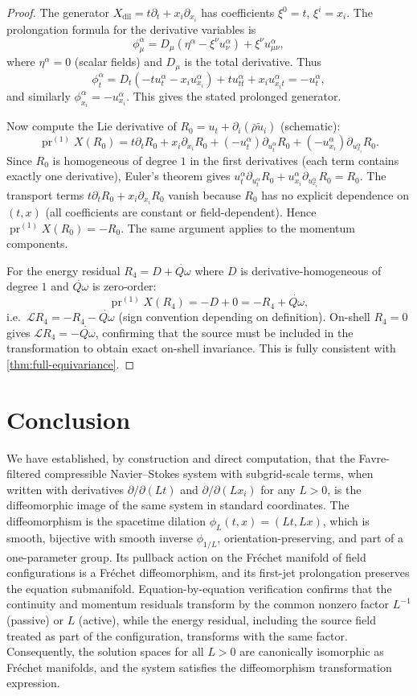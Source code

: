 \documentclass[11pt]{article}
\theoremstyle{definition}
\theoremstyle{remark}
\newcommand{\barrho}{\bar{\rho}}
\newcommand{\tilu}{\widetilde{u}}
\newcommand{\Qdot}{\dot{Q\omega}}
\begin{document}
\begin{proof}
The generator $X_{\mathrm{dil}}=t\partial_t+x_i\partial_{x_i}$ has
coefficients $\xi^0=t$, $\xi^i=x_i$.  The prolongation formula for the
derivative variables is
\[
\phi^\alpha_\mu=D_\mu(\eta^\alpha-\xi^\nu u^\alpha_\nu)+\xi^\nu u^\alpha_{\mu\nu},
\]
where $\eta^\alpha=0$ (scalar fields) and $D_\mu$ is the total derivative.
Thus
\[
\phi^\alpha_t=D_t(-t u^\alpha_t-x_i u^\alpha_{x_i})+t u^\alpha_{tt}+x_i u^\alpha_{x_it}
=-u^\alpha_t,
\]
and similarly $\phi^\alpha_{x_i}=-u^\alpha_{x_i}$.  This gives the stated
prolonged generator.

Now compute the Lie derivative of $R_0=u_t+\partial_i(\barrho\tilu_i)$ (schematic):
\[
\operatorname{pr}^{(1)}X(R_0)
=t\partial_t R_0+x_i\partial_{x_i}R_0
+(-u^\alpha_t)\partial_{u^\alpha_t}R_0
+(-u^\alpha_{x_i})\partial_{u^\alpha_{x_i}}R_0.
\]
Since $R_0$ is homogeneous of degree $1$ in the first derivatives (each term
contains exactly one derivative), Euler's theorem gives
$u^\alpha_t\partial_{u^\alpha_t}R_0+u^\alpha_{x_i}\partial_{u^\alpha_{x_i}}R_0=R_0$.
The transport terms $t\partial_t R_0+x_i\partial_{x_i}R_0$ vanish because
$R_0$ has no explicit dependence on $(t,x)$ (all coefficients are constant or
field-dependent).  Hence $\operatorname{pr}^{(1)}X(R_0)=-R_0$.  The same
argument applies to the momentum components.

For the energy residual $R_4=D+\Qdot$ where $D$ is derivative-homogeneous of
degree $1$ and $\Qdot$ is zero-order:
\[
\operatorname{pr}^{(1)}X(R_4)=-D+0=-R_4+\Qdot,
\]
i.e.\ $\mathcal L R_4=-R_4-\Qdot$ (sign convention depending on definition).
On-shell $R_4=0$ gives $\mathcal L R_4=-\Qdot$, confirming that the source
must be included in the transformation to obtain exact on-shell invariance.
This is fully consistent with \ref{thm:full-equivariance}.
\end{proof}

\section{Conclusion}
\label{sec:conclusion}

We have established, by construction and direct computation, that the
Favre-filtered compressible Navier--Stokes system with subgrid-scale terms,
when written with derivatives $\partial/\partial(Lt)$ and
$\partial/\partial(Lx_i)$ for any $L>0$, is the diffeomorphic image of the
same system in standard coordinates.  The diffeomorphism is the spacetime
dilation $\phi_L(t,x)=(Lt,Lx)$, which is smooth, bijective with smooth
inverse $\phi_{1/L}$, orientation-preserving, and part of a one-parameter
group.  Its pullback action on the Fr\'echet manifold of field configurations
is a Fr\'echet diffeomorphism, and its first-jet prolongation preserves the
equation submanifold.  Equation-by-equation verification confirms that the
continuity and momentum residuals transform by the common nonzero factor
$L^{-1}$ (passive) or $L$ (active), while the energy residual, including the
source field treated as part of the configuration, transforms with the same
factor.  Consequently, the solution spaces for all $L>0$ are canonically
isomorphic as Fr\'echet manifolds, and the system satisfies the
diffeomorphism transformation expression.
\end{document}
